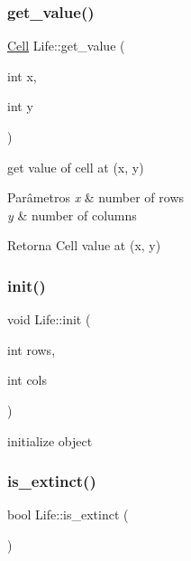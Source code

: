 \subsubsection{\texorpdfstring{get\+\_\+value()}{get\_value()}}
{\footnotesize\ttfamily \hyperlink{life_8h_a0133c02dfc35ffbaf07ad1a587dac4d1}{Cell} Life\+::get\+\_\+value (\begin{DoxyParamCaption}\item[{int}]{x,  }\item[{int}]{y }\end{DoxyParamCaption})}

get value of cell at (x, y) 
\begin{DoxyParams}{Parâmetros}
{\em x} & number of rows \\
\hline
{\em y} & number of columns \\
\hline
\end{DoxyParams}
\begin{DoxyReturn}{Retorna}
Cell value at (x, y) 
\end{DoxyReturn}
\mbox{\label{classLife_a8598dfc9e71062fc3e7345a2a86015cc}} 
\subsubsection{\texorpdfstring{init()}{init()}}
{\footnotesize\ttfamily void Life\+::init (\begin{DoxyParamCaption}\item[{int}]{rows,  }\item[{int}]{cols }\end{DoxyParamCaption})\hspace{0.3cm}{\ttfamily [private]}}



initialize object 

\mbox{\label{classLife_a7b7cd244c2ce5b7d6ed0db9a188b2256}} 
\subsubsection{\texorpdfstring{is\+\_\+extinct()}{is\_extinct()}}
{\footnotesize\ttfamily bool Life\+::is\+\_\+extinct (\begin{DoxyParamCaption}{ }\end{DoxyParamCaption})}

